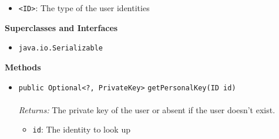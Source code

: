 \begin{itemize}
\item \lstinline|<ID>|: The type of the user identities
\end{itemize}


\textbf{\sffamily Superclasses and Interfaces}
\begin{itemize}
\item \lstinline|java.io.Serializable|
\end{itemize}



\textbf{\sffamily Methods}
\begin{itemize}
\item \lstinline|public Optional<?, PrivateKey>| \lstinline|getPersonalKey|\lstinline|(ID id)|\\ \\[-0.6em]
\emph{Returns:} The private key of the user or absent if the user doesn't exist.
\begin{itemize}
\item \lstinline|id|: The identity to look up
\end{itemize}



\end{itemize}


